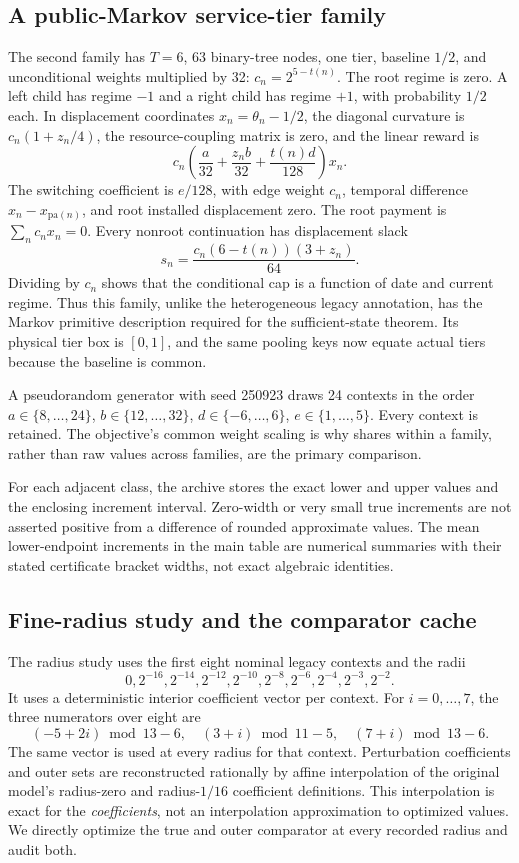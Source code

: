 \documentclass[11pt,letterpaper]{article}
\theoremstyle{definition}\newtheorem{remark}[theorem]{Remark}
\begin{document}
\subsection{A public-Markov service-tier family}
The second family has $T=6$, 63 binary-tree nodes, one tier, baseline $1/2$, and unconditional weights multiplied by 32:
$c_n=2^{5-t(n)}$. The root regime is zero. A left child has regime $-1$ and a right child has regime $+1$, with probability $1/2$ each. In displacement coordinates $x_n=\theta_n-1/2$, the diagonal curvature is
$c_n(1+z_n/4)$, the resource-coupling matrix is zero, and the linear reward is
\[
 c_n\left(\frac{a}{32}+\frac{z_n b}{32}+\frac{t(n)d}{128}\right)x_n.
\]
The switching coefficient is $e/128$, with edge weight $c_n$, temporal difference $x_n-x_{\mathrm{pa}(n)}$, and root installed displacement zero. The root payment is $\sum_n c_nx_n=0$. Every nonroot continuation has displacement slack
\[
 s_n=\frac{c_n(6-t(n))(3+z_n)}{64}.
\]
Dividing by $c_n$ shows that the conditional cap is a function of date and current regime. Thus this family, unlike the heterogeneous legacy annotation, has the Markov primitive description required for the sufficient-state theorem. Its physical tier box is $[0,1]$, and the same pooling keys now equate actual tiers because the baseline is common.

A pseudorandom generator with seed 250923 draws 24 contexts in the order
$a\in\{8,\ldots,24\}$, $b\in\{12,\ldots,32\}$, $d\in\{-6,\ldots,6\}$, $e\in\{1,\ldots,5\}$. Every context is retained. The objective's common weight scaling is why shares within a family, rather than raw values across families, are the primary comparison.

For each adjacent class, the archive stores the exact lower and upper values and the enclosing increment interval. Zero-width or very small true increments are not asserted positive from a difference of rounded approximate values. The mean lower-endpoint increments in the main table are numerical summaries with their stated certificate bracket widths, not exact algebraic identities.

\subsection{Fine-radius study and the comparator cache}
The radius study uses the first eight nominal legacy contexts and the radii
\[
0,2^{-16},2^{-14},2^{-12},2^{-10},2^{-8},2^{-6},2^{-4},2^{-3},2^{-2}.
\]
It uses a deterministic interior coefficient vector per context. For $i=0,\ldots,7$, the three numerators over eight are
\[
(-5+2i)\bmod13-6,\quad (3+i)\bmod11-5,\quad (7+i)\bmod13-6.
\] The same vector is used at every radius for that context. Perturbation coefficients and outer sets are reconstructed rationally by affine interpolation of the original model's radius-zero and radius-$1/16$ coefficient definitions. This interpolation is exact for the \emph{coefficients}, not an interpolation approximation to optimized values. We directly optimize the true and outer comparator at every recorded radius and audit both.
\end{document}
